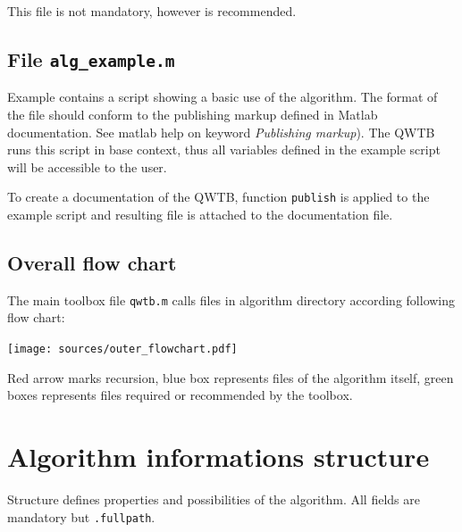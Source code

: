 \documentclass[12pt,a4paper,oneside]{report} %
\newcommand{\li}[1]{\lstinline{#1}}     %
\begin{document}
This file is not mandatory, however is recommended.

\subsection{File {\tt alg\_example.m}} %
\label{filealgexample}

Example contains a script showing a basic use of the algorithm. The format of the file should
conform to the publishing markup defined in Matlab documentation. See matlab help on keyword
\emph{Publishing markup}). The QWTB runs this script in base context, thus all variables defined in
the example script will be accessible to the user.

To create a documentation of the QWTB, function \li{publish} is applied to the example script
and resulting file is attached to the documentation file.

\subsection{Overall flow chart} %
The main toolbox file {\tt qwtb.m} calls files in algorithm directory according following flow
chart:
\begin{center}
        \texttt{[image: sources/outer\_flowchart.pdf]}
\end{center}
Red arrow marks recursion, blue box represents files of the algorithm itself, green boxes represents
files required or recommended by the toolbox.

\section{Algorithm informations structure} %
\label{structalginfo}
Structure defines properties and possibilities of the algorithm. All fields are mandatory but
\li{.fullpath}.
\end{document}
